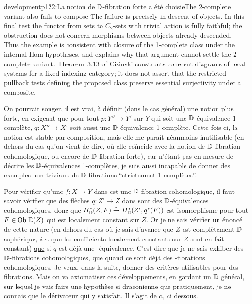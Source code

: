 \begin{dcomment}{development}{p122:La notion de $\mathbb{D}$-fibration forte a été choisie}{The 2-complete variant also fails to compose}
The failure is precisely in descent of objects. In this final test the functor from sets to $C_2$-sets with trivial action is fully faithful; the obstruction does not concern morphisms between objects already descended. Thus the example is consistent with closure of the 1-complete class under the internal-Hom hypotheses, and explains why that argument cannot settle the 2-complete variant. Theorem~3.13 of Cisinski constructs coherent diagrams of local systems for a fixed indexing category; it does not assert that the restricted pullback tests defining the proposed class preserve essential surjectivity under a composite.
\end{dcomment}


On pourrait songer, il est vrai, à définir (dans le cas général) une notion plus forte, en exigeant que pour tout $p : Y'' \to Y'$ sur $Y$ qui soit une $\mathbb{D}$-équivalence 1-complète, $q : X'' \to X'$ soit aussi une $\mathbb{D}$-équivalence 1-complète. Cette fois-ci, la notion est stable par composition, mais elle me paraît néanmoins inutilisable (en dehors du cas qu'on vient de dire, où elle coïncide avec la notion de $\mathbb{D}$-fibration cohomologique, ou encore de $\mathbb{D}$-fibration forte), car n'étant pas en mesure de décrire les $\mathbb{D}$-équivalences 1-complètes, je suis aussi incapable de donner des exemples non triviaux de $\mathbb{D}$-fibrations “strictement 1-complètes”.

Pour vérifier qu'une $f : X \to Y$ dans \Dia{} est une $\mathbb{D}$-fibration cohomologique, il faut
savoir vérifier que des flèches $q : Z' \to Z$ dans \Dia{} sont des $\mathbb{D}$-équivalences cohomologiques, donc que $H^*_{\mathbb{D}}(Z,F) \overset{\sim}{\rightarrow} H^*_{\mathbb{D}}(Z',q^*(F))$ est isomorphisme pour tout $F \in \mathsf{Ob}\ \mathbb{D}(Z)$ qui est localement constant sur $Z$. Or je ne sais vérifier un énoncé de cette nature (en dehors du cas où je sais d'avance que $Z$ est complètement $\mathbb{D}$-asphérique, \textit{i.e.} que les coefficients localement constants sur $Z$ sont en fait constant) \underline{que} si $q$ est déjà une \Hot-équivalence. %
C'est dire que je ne sais exhiber des $\mathbb{D}$-fibrations cohomologiques, que quand ce sont déjà des \HOT-fibrations cohomologiques. Je veux, dans la suite, donner des critères utilisables pour des \HOT-fibrations. Mais on va axiomatiser ces développements, en gardant un $\mathbb{D}$ général, sur lequel je vais faire une hypothèse si draconienne que pratiquement, je ne connais que le dérivateur \HOT{} qui y satisfait. Il s'agit de $c_1$ ci dessous.

